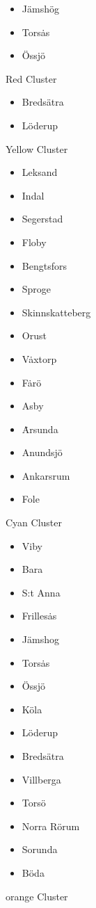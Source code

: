 \begin{figure}
\begin{itemize}
\item J\"amsh\"og
\item Tors\.as
\item \"Ossj\"o
\end{itemize}
\caption{Red Cluster}
\label{red-cluster}
\end{figure}

\begin{figure}
\begin{itemize}
\item Breds\"atra
\item L\"oderup
\end{itemize}
\caption{Yellow Cluster}
\label{yellow-cluster}
\end{figure}

\begin{figure}
\begin{itemize}
\item Leksand
\item Indal
\item Segerstad
\item Floby
\item Bengtsfors
\item Sproge
\item Skinnskatteberg
\item Orust
\item V\.axtorp
\item F\.ar\"o
\item Asby
\item \.Arsunda
\item Anundsj\"o
\item Ankarsrum
\item Fole
\end{itemize}
\caption{Cyan Cluster}
\label{cyan-cluster}
\end{figure}

\begin{figure}
\begin{itemize}
\item Viby
\item Bara
\item S:t Anna
\item Frilles\.as
\item J\"amshog
\item Tors\.as
\item \"Ossj\"o
\item K\"ola
\item L\"oderup
\item Breds\"atra
\item Villberga
\item Tors\"o
\item Norra R\"orum
\item Sorunda
\item B\"oda
\end{itemize}
\caption{orange Cluster}
\label{orange-cluster}
\end{figure}

